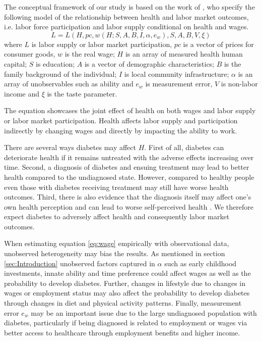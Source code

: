 \documentclass[12pt,english,british]{article}
\begin{document}
  
The conceptual framework of our study is based on the work of \citet{Strauss1998},   who specify the following model of the relationship between health and labor market outcomes, i.e. labor force participation and labor supply conditional on health and wages.
\begin{equation}
L=L(H, pc, w(H;S,A,B,I,\alpha,e_{w}), S, A, B, V, \xi) \label{eq:wage}
\end{equation}
where $L$ is labor supply or labor market participation, $pc$ is a vector of prices for consumer goods, $w$ is the real wage; $H$ is an array of measured health human capital; $S$ is education; $A$ is a vector of demographic characteristics; $B$ is the family background of the individual; $I$ is local community infrastructure; $\alpha$ is an array of unobservables such as ability and $e_w$ is measurement error, $V$ is non-labor income and $\xi$ is the taste parameter. 

The equation showcases the joint effect of health on both wages and labor supply or labor market participation. Health affects labor supply and participation indirectly by changing wages and directly by impacting the ability to work.

There are several ways diabetes may affect $H$. First of all, diabetes can deteriorate health if it remains untreated with the adverse effects increasing over time. Second, a diagnosis of diabetes and ensuing treatment may lead to better health compared to the undiagnosed state. However, compared to healthy people even those with diabetes receiving treatment may still have worse health outcomes. Third, there is also evidence that the diagnosis itself may affect one's own health perception and can lead to worse self-perceived health \citep{Thoolen2006a}. We therefore expect diabetes to adversely affect health and consequently labor market outcomes.

When estimating equation  \ref{eq:wage} empirically with observational data, unobserved heterogeneity may bias the results. As mentioned in section  \ref{sec:Introduction} unobserved factors captured in $\alpha$ such as early childhood investments, innate ability and time preference could affect wages as well as the probability to develop diabetes. Further, changes in lifestyle due to changes in wages or employment status may also affect the probability to develop diabetes through changes in diet and physical activity patterns. Finally, measurement error $e_w$ may be an important issue due to the large undiagnosed population with diabetes, particularly if being diagnosed is related to employment or wages via better access to healthcare through employment benefits and higher income.
\end{document}
